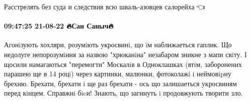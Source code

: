 Расстрелять без суда и следствия всю шваль-азовцев салорейха🤪👈

\paragraph{09:47:25 21-08-22 🔥Сан Саныч🔥}

Агонiзують хохляри, розумiють укросвинi, що ïм наближаеться гаплик. Що недолуге непорозумiння за назвою "хрюканiна" незабаром зникне з мапи свiту. I щосили намагаються "перемогти" Москалiв в Одноклашках (втiм, заборонених парашею ще в 14 роцi) через картинки, малюнки, фотоколажi i неймовipну брехню.
Брехати, брехати i ще раз брехати - ось що залишаеться укросвиням перед кiнцем.
Справжнi бicи! Знають, що загинуть i продовжують творити зло.
